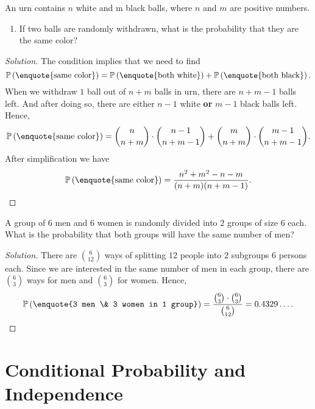 \documentclass{article}[12pt]
\newenvironment{solution}
  {\renewcommand\qedsymbol{$\blacksquare$}\begin{proof}[Solution]}
  {\end{proof}}
\newenvironment{problem}[1]
  {\renewcommand\theinnercustomprblm{#1}\innercustomprblm}
  {\endinnercustomprblm}
\renewcommand{\P}{\mathbb{P}}
\begin{document}
\begin{problem}{29a}\normalfont
An urn contains $n$ white and m black balls, where $n$ and $m$ are positive numbers.
\begin{enumerate}[label=(\alph*)]
    \item If two balls are randomly withdrawn, what is the probability that they are the same color?
\end{enumerate}
\end{problem}
\begin{solution}
The condition implies that we need to find
\begin{equation*}
    \P\left(\text{\enquote{same color}}\right) = \P\left(\text{\enquote{both white}}\right) + \P\left(\text{\enquote{both black}}\right).
\end{equation*}
When we withdraw $1$ ball out of $n + m$ balls in urn, there are $n + m - 1$ balls left.
And after doing so, there are either $n - 1$ white \textbf{or} $m - 1$ black balls left.
Hence,
\begin{equation*}
    \P\left(\text{\enquote{same color}}\right) = \binom{n}{n+m}\cdot\binom{n-1}{n+m-1} + \binom{m}{n+m}\cdot\binom{m-1}{n+m-1}.
\end{equation*}
After simplification we have
\begin{equation*}
    \P\left(\text{\enquote{same color}}\right) = \dfrac{n^{2} + m^{2} - n - m}{(n + m)(n + m -1)}.
\end{equation*}
\end{solution}

\begin{problem}{49}\normalfont
A group of $6$ men and $6$ women is randomly divided into $2$ groups of size $6$ each. 
What is the probability that both groups will have the same number of men?
\end{problem}
\begin{solution}
There are $\binom{6}{12}$ ways of splitting $12$ people into $2$ subgroups $6$ persons each.
Since we are interested in the same number of men in each group, there are $\binom{6}{3}$ ways for men and $\binom{6}{3}$ for women.
Hence,
\begin{equation*}
    \P\left(\text{\enquote{3 men \& 3 women in 1 group}}\right) = \dfrac{\binom{6}{3}\cdot\binom{6}{3}}{\binom{6}{12}} = 0.4329\ldots.
\end{equation*}

\end{solution}

\section{Conditional Probability and Independence}
\end{document}
